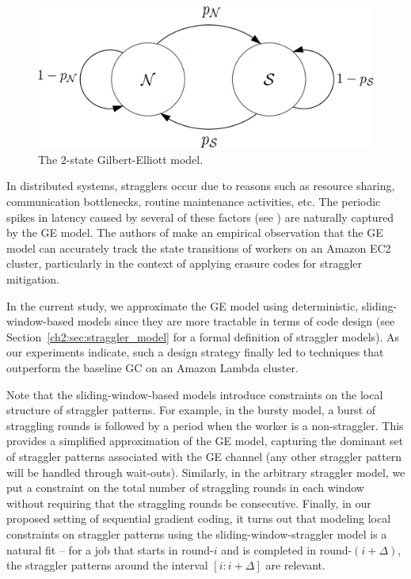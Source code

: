 \begin{figure}[!h]
	\centering
	\includegraphics[scale=0.25]{figs/ch2/fig_GE_model_v2}
	\caption{The $2$-state Gilbert-Elliott model.}
	\label{ch2:fig:GE_model}
\end{figure}

In distributed systems, stragglers occur due to reasons such as resource sharing, communication bottlenecks, routine maintenance activities, etc. The periodic spikes in latency caused by several of these factors (see \cite{tailatscale,Bolot93}) are naturally captured by the GE model. The authors of \cite{timelycodedcomputing} make an empirical observation that the GE model can accurately track the state transitions of workers on an Amazon EC2 cluster, particularly in the context of applying erasure codes for straggler mitigation. 

In the current study, we approximate the GE model using deterministic, sliding-window-based models since they are more tractable in terms of code design (see Section~\ref{ch2:sec:straggler_model} for a formal definition of straggler models). As our experiments indicate, such a design strategy finally led to techniques that outperform the baseline GC on an Amazon Lambda cluster.

Note that the sliding-window-based models introduce constraints on the local structure of straggler patterns. For example, in the bursty model, a burst of straggling rounds is followed by a period when the worker is a non-straggler. This provides a simplified approximation of the GE model, capturing the dominant set of straggler patterns associated with the GE channel (any other straggler pattern will be handled through wait-outs).  Similarly, in the arbitrary straggler model, we put a constraint on the total number of straggling rounds in each window without requiring that the straggling rounds be consecutive. Finally, in our proposed setting of sequential gradient coding, it turns out that modeling local constraints on straggler patterns using the sliding-window-straggler model is a natural fit -- for a job that starts in round-$i$ and is completed in round-$(i+\Delta)$, the straggler patterns around the interval $[i:i+\Delta]$ are relevant.  


